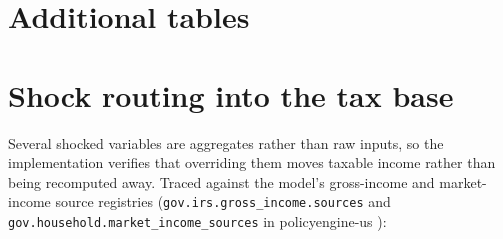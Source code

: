 \section{Additional tables}\label{app:tables}

\begin{table}[h]
\centering
\tabRealization
\caption{Net revenue under Rapid~/~proportional by realized share of the
incremental capital flow, \$B, 2030.}
\label{tab:realization}
\end{table}

\begin{table}[h]
\centering
\tabCapitalScope
\caption{Capital-scope sensitivity: net revenue with and without taxable
pension and IRA distributions in the capital set (proportional variants),
\$B, 2030.}
\label{tab:scope}
\end{table}

\begin{table}[h]
\centering
\tabStates
\caption{Top ten states by net state revenue change (state tax before
refundable credits minus refundable state credits), Rapid~/~proportional,
\$B, 2030.}
\label{tab:states}
\end{table}

\begin{table}[h]
\centering
\tabSweep
\caption{The mechanism sweep, \genSweepYear{}: net revenue, federal income
tax, SPM poverty and net Gini by share of labor income shifted to capital.}
\label{tab:sweep}
\end{table}

\clearpage
\section{Shock routing into the tax base}\label{app:routing}

Several shocked variables are aggregates rather than raw inputs, so the
implementation verifies that overriding them moves taxable income rather
than being recomputed away. Traced against the model's gross-income and
market-income source registries (\texttt{gov.irs.gross\_income.sources} and
\texttt{gov.household.market\_income\_sources} in policyengine-us
\genModelVersion{}):

